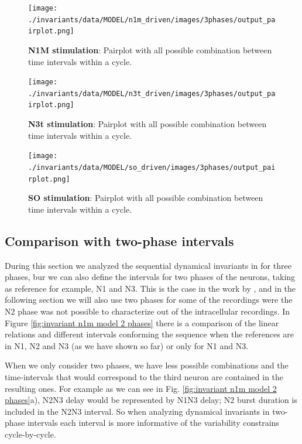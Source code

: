 \begin{figure}[htbp]
	\centering
	\texttt{[image: ./invariants/data/MODEL/n1m\_driven/images/3phases/output\_pairplot.png]}
	\caption{\textbf{N1M stimulation}: Pairplot with all possible combination between time intervals within a cycle.}
	\label{fig:model n1m stimulation pairplot}
\end{figure}
 
\begin{figure}[htbp]
	\centering
	\texttt{[image: ./invariants/data/MODEL/n3t\_driven/images/3phases/output\_pairplot.png]}
	\caption{\textbf{N3t stimulation}: Pairplot with all possible combination between time intervals within a cycle.}
	\label{fig:model n3t stimulation pairplot}
\end{figure}

\begin{figure}[htbp]
	\centering
	\texttt{[image: ./invariants/data/MODEL/so\_driven/images/3phases/output\_pairplot.png]}
	\caption{\textbf{SO stimulation}: Pairplot with all possible combination between time intervals within a cycle.}
	\label{fig:model so stimulation pairplot}
\end{figure}

%
\subsection{Comparison with two-phase intervals}
During this section we analyzed the sequential dynamical invariants in for three phases, bur we can also define the intervals for two phases of the neurons, taking as reference for example, N1 and N3. This is the case in the work by \cite{elices_robust_2019}, and in the following section we will also use two phases for some of the recordings were the N2 phase was not possible to characterize out of the intracellular recordings. In Figure \ref{fig:invariant n1m model 2 phases} there is a comparison of the linear relations and different intervals conforming the sequence when the references are in N1, N2 and N3 (as we have shown so far) or only for N1 and N3.

When we only consider two phases, we have less possible combinations and the time-intervals that would correspond to the third neuron are contained in the resulting ones. For example as we can see in Fig. \ref{fig:invariant n1m model 2 phases}a), N2N3 delay would be represented by N1N3 delay; N2 burst duration is included in the N2N3 interval. So when analyzing dynamical invariants in two-phase intervals each interval is more informative of the variability constrains cycle-by-cycle. 

